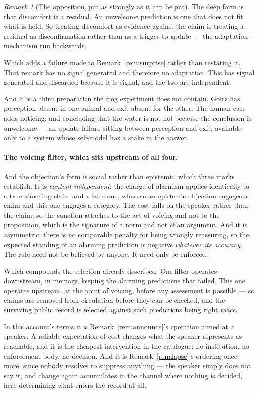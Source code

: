 \documentclass[11pt,a4paper]{article}
\theoremstyle{remark}
\newtheorem{remark}[definition]{Remark}
\begin{document}
\begin{remark}[The opposition, put as strongly as it can be put]
The deep form is that discomfort is a residual. An unwelcome prediction is one that does not fit
what is held. So treating discomfort as evidence against the claim is treating a residual as
disconfirmation rather than as a trigger to update --- the adaptation mechanism run backwards.

Which adds a failure mode to Remark~\ref{rem:surprise} rather than restating it. That remark has
no signal generated and therefore no adaptation. This has signal generated and discarded because
it is signal, and the two are independent.

And it is a third preparation the frog experiment does not contain. Goltz has perception absent in one
animal and exit absent for the other. The human case adds noticing, and concluding that the water is not hot because the
conclusion is unwelcome --- an update failure sitting between perception and exit, available only
to a system whose self-model has a stake in the answer.

\paragraph{The voicing filter, which sits upstream of all four.}
And the objection's form is social rather than epistemic, which three marks establish. It is
\emph{content-independent}: the charge of alarmism applies identically to a true alarming claim and a
false one, whereas an epistemic objection engages a claim and this one engages a category. The cost
falls on the speaker rather than the claim, so the sanction attaches to the act of voicing and not to
the proposition, which is the signature of a norm and not of an argument. And it is asymmetric:
there is no comparable penalty for being wrongly reassuring, so the expected standing of an alarming
prediction is negative \emph{whatever its accuracy}. The rule need not be believed by anyone. It need
only be enforced.

Which compounds the selection already described. One filter operates downstream, in memory,
keeping the alarming predictions that failed. This one operates upstream, at the point of voicing,
before any assessment is possible --- so claims are removed from circulation before they can be checked,
and the surviving public record is selected against such predictions being right \emph{twice}.

In this account's terms it is Remark~\ref{rem:announce}'s operation aimed at a speaker. A reliable
expectation of cost changes what the speaker represents as reachable, and it is the cheapest intervention
in the catalogue: no institution, no enforcement body, no decision. And it is
Remark~\ref{rem:lapse}'s ordering once more, since nobody resolves to suppress anything --- the speaker
simply does not say it, and change again accumulates in the channel where nothing is decided, here
determining what enters the record at all.


\end{remark}
\end{document}
